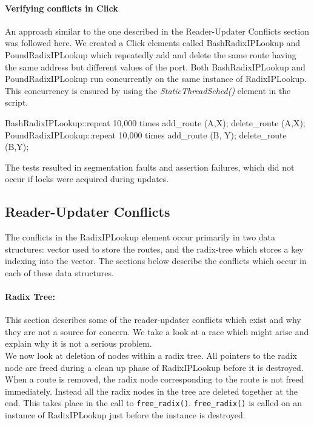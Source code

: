 \documentclass[a4paper,marginparwidth=50pt,marginparsep=10pt]{article}
\begin{document}
\paragraph{Verifying conflicts in Click}
An approach similar to the one described in the Reader-Updater Conflicts section was followed here. We created a Click elements called BashRadixIPLookup and PoundRadixIPLookup which repeatedly add and delete the same route having the same address but different values of the port. Both BashRadixIPLookup and PoundRadixIPLookup run concurrently on the same instance of RadixIPLookup. This concurrency is ensured by using the \emph{StaticThreadSched()} element in the script.
\begin{code}
  BashRadixIPLookup::repeat 10,000 times {
    add_route (A,X);
    delete_route (A,X);
  }
  PoundRadixIPLookup::repeat 10,000 times {
    add_route (B, Y);
    delete_route (B,Y);
  } 
\end{code}
The tests resulted in segmentation faults and assertion failures, which did not occur if locks were acquired during updates.
\subsection{Reader-Updater Conflicts}
The conflicts in the RadixIPLookup element occur primarily in two data structures: vector used to store the routes, and the radix-tree which stores a key indexing into the vector. The sections below describe the conflicts which occur in each of these data structures.
\paragraph{Radix Tree:}
This section describes some of the reader-updater conflicts which exist and why they are not a source for concern. We take a look at a race which might arise and explain why it is not a serious problem.\\

We now look at deletion of nodes within a radix tree. All pointers to the radix node are freed during a clean up phase of RadixIPLookup before it is destroyed. When a route is removed, the radix node corresponding to the route is not freed immediately. Instead all the radix nodes in the tree are deleted together at the end. This takes place in the call to \verb+free_radix()+. \verb+free_radix()+ is called on an instance of RadixIPLookup just before the instance is destroyed.\\
\end{document}
